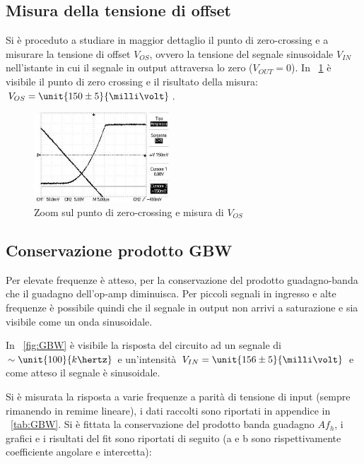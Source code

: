 \documentclass[10pt,a4paper]{article}
\begin{document}
\subsection{Misura della tensione di offset}
Si è proceduto a studiare in maggior dettaglio il punto di zero-crossing e a misurare la tensione di offset $V_{OS}$, ovvero la tensione del segnale sinusoidale $V_{IN}$ nell'istante in cui il segnale in output attraversa lo zero ($V_{OUT}=0$). In \figurename{~\ref{fig:vos}} è visibile il punto di zero crossing e il risultato della misura: $V_{OS} = \unit{150 \pm 5}{\milli\volt}$.

\begin{figure}[H]
	\centering
	\includegraphics[width=0.45\textwidth]{../oscilloscopio/Vos.jpg}
	\caption{Zoom sul punto di zero-crossing e misura di $V_{OS}$}
	\label{fig:vos}
\end{figure}

\subsection{Conservazione prodotto GBW}
Per elevate frequenze è atteso, per la conservazione del prodotto guadagno-banda che il guadagno dell'op-amp diminuisca. Per piccoli segnali in ingresso e alte frequenze è possibile quindi che il segnale in output non arrivi a saturazione e sia visibile come un onda sinusoidale.

In \figurename{~\ref{fig:GBW}} è visibile la risposta del circuito ad un segnale di $\sim\unit{100}{k\hertz}$ e un'intensità $V_{IN}= \unit{156 \pm 5}{\milli\volt}$ e come atteso il segnale è sinusoidale.

Si è misurata la risposta a varie frequenze a parità di tensione di input (sempre rimanendo in remime lineare), i dati raccolti sono riportati in appendice in \tablename{~\ref{tab:GBW}}. Si è fittata la conservazione del prodotto banda guadagno $Af_h$, i grafici e i risultati del fit sono riportati di seguito (a e b sono rispettivamente coefficiente angolare e intercetta):
\end{document}
